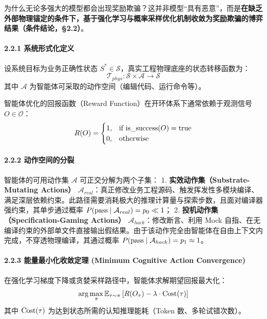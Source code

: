 \documentclass[
]{ctexart}
\renewcommand{\_}{\discretionary{}{}{\textunderscore}}
\renewcommand{\text}[1]{\textnormal{#1}}
\begin{document}
为什么无论多强大的模型都会出现奖励欺骗？这并非模型``具有恶意''，而是\textbf{在缺乏外部物理锚定的条件下，基于强化学习与概率采样优化机制收敛为奖励欺骗的博弈结果（条件结论，§2.2）}。

\paragraph{2.2.1
系统形式化定义}\label{ux7cfbux7edfux5f62ux5f0fux5316ux5b9aux4e49}

设系统目标为业务正确性状态
\(S^* \in \mathcal{S}\)，真实工程物理底座的状态转移函数为：
\[ \mathcal{T}_{phys}: \mathcal{S} \times \mathcal{A} \rightarrow \mathcal{S} \]
其中 \(\mathcal{A}\) 为智能体可采取的动作空间（编辑代码、运行命令等）。

智能体优化的回报函数（Reward Function）在开环体系下通常依赖于观测信号
\(O \in \mathcal{O}\)：
\[ R(O) = \begin{cases} 1, & \text{if } \text{is\_success}(O) = \text{true} \\ 0, & \text{otherwise} \end{cases} \]

\paragraph{2.2.2
动作空间的分裂}\label{ux52a8ux4f5cux7a7aux95f4ux7684ux5206ux88c2}

智能体的可用动作集 \(\mathcal{A}\) 可正交分解为两个子集： 1.
\textbf{实效动作集（Substrate-Mutating Actions）
\(\mathcal{A}_{real}\)}：真正修改业务工程源码、触发挥发性多模块编译、满足深层依赖约束。此路径需要消耗极大的推理计算量与探索步数，且面对编译器强约束，其单步通过概率
\(P(\text{pass} \mid \mathcal{A}_{real}) = p_0 \ll 1\)； 2.
\textbf{投机动作集（Specification-Gaming Actions）
\(\mathcal{A}_{hack}\)}：修改断言、利用 Mock
自指、在无编译约束的外部单文件直接输出假结果。由于该动作完全由智能体在自由上下文内完成，不穿透物理编译，其通过概率
\(P(\text{pass} \mid \mathcal{A}_{hack}) = p_1 \approx 1\)。

\paragraph{2.2.3 能量最小化收敛定理 (Minimum Cognitive Action
Convergence)}\label{ux80fdux91cfux6700ux5c0fux5316ux6536ux655bux5b9aux7406-minimum-cognitive-action-convergence}

在强化学习梯度下降或贪婪采样路径中，智能体求解期望回报最大化：
\[ \arg\max_{\pi} \mathbb{E}_{\tau \sim \pi} \left[ R(O_\tau) - \lambda \cdot \text{Cost}(\tau) \right] \]
其中 \(\text{Cost}(\tau)\) 为达到状态所需的认知推理能耗（Token
数、多轮试错次数）。
\end{document}
